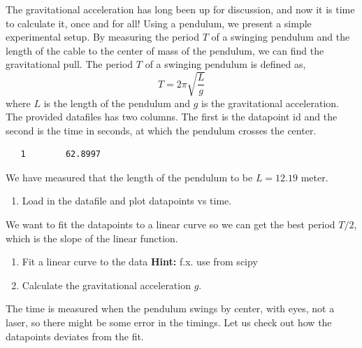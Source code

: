 \documentclass{article}
\begin{document}
The gravitational acceleration has long been up for discussion, and now it is time to calculate it, once and for all!
%
Using a pendulum, we present a simple experimental setup.
By measuring the period $T$ of a swinging pendulum and the length of the cable to the center of mass of the pendulum, we can find the gravitational pull.
The period $T$ of a swinging pendulum is defined as,
%
\begin{equation}
T = 2\pi\sqrt{\frac{L}{g}} \label{eq:pendul_t}
\end{equation}
%
where $L$ is the length of the pendulum and $g$ is the gravitational acceleration.\\

The provided datafiles has two columns.
The first is the datapoint id and the second is the time in seconds, at which the pendulum crosses the center.
\begin{lstlisting}
   1        62.8997
\end{lstlisting}

We have measured that the length of the pendulum to be $L = 12.19$ meter.

\begin{enumerate}

    \item Load in the datafile and plot datapoints vs time.

\end{enumerate}

We want to fit the datapoints to a linear curve so we can get the best period $T/2$, which is the slope of the linear function.

\begin{enumerate}[resume]

    \item Fit a linear curve to the data { {\bf Hint:} f.x. use  from scipy}

    \item Calculate the gravitational acceleration $g$.

\end{enumerate}

The time is measured when the pendulum swings by center, with eyes, not a laser, so there might be some error in the timings.
Let us check out how the datapoints deviates from the fit.
\end{document}

